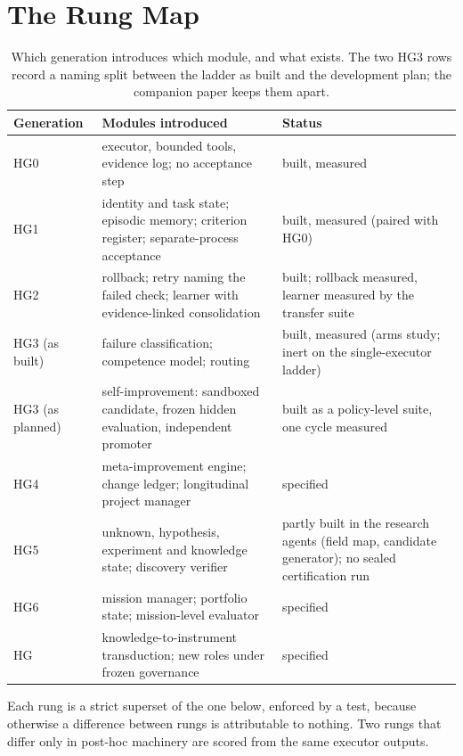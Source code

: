 \section{The Rung Map}\label{sec:rungs}

\begin{table}[!htbp]
\centering\small
\begin{tabularx}{\textwidth}{@{}lYY@{}}
\toprule
Generation & Modules introduced & Status \\
\midrule
HG0 & executor, bounded tools, evidence log; no acceptance step & built, measured \\
HG1 & identity and task state; episodic memory; criterion register; separate-process acceptance & built, measured (paired with HG0) \\
HG2 & rollback; retry naming the failed check; learner with evidence-linked consolidation & built; rollback measured, learner measured by the transfer suite \\
HG3 (as built) & failure classification; competence model; routing & built, measured (arms study; inert on the single-executor ladder) \\
HG3 (as planned) & self-improvement: sandboxed candidate, frozen hidden evaluation, independent promoter & built as a policy-level suite, one cycle measured \\
HG4 & meta-improvement engine; change ledger; longitudinal project manager & specified \\
HG5 & unknown, hypothesis, experiment and knowledge state; discovery verifier & partly built in the research agents (field map, candidate generator); no sealed certification run \\
HG6 & mission manager; portfolio state; mission-level evaluator & specified \\
HG\Om{} & knowledge-to-instrument transduction; new roles under frozen governance & specified \\
\bottomrule
\end{tabularx}
\caption{Which generation introduces which module, and what exists. The two HG3 rows record a naming split between the ladder as built and the development plan; the companion paper keeps them apart.}
\label{tab:rungs}
\end{table}

Each rung is a strict superset of the one below, enforced by a test, because otherwise a difference between rungs is attributable to nothing. Two rungs that differ only in post-hoc machinery are scored from the same executor outputs.

